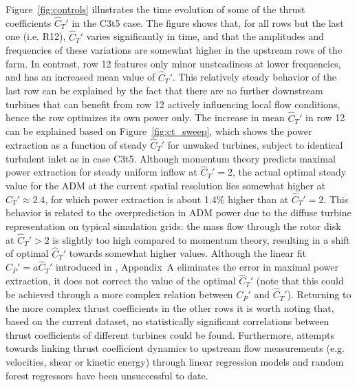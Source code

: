 \documentclass[wes, manuscript]{copernicus}
\newcommand{\cthat}{\widehat{C}_T'}
\begin{document}
Figure~\ref{fig:controls} illustrates the time evolution of some of  the thrust coefficients $\cthat$ in the C3t5 case. The figure shows that, for all rows but the last one (i.e. R12), $\cthat$ varies significantly in time, and that the amplitudes and frequencies of these variations are somewhat higher in the upstream rows of the farm. In contrast, row 12 features only minor unsteadiness at lower frequencies, and has an increased mean value of $\cthat$. This relatively steady behavior of the last row can be explained by the fact that there are no further downstream turbines that can benefit from row 12 actively influencing local flow conditions, hence the row optimizes its own power only. The increase in mean $\cthat$ in row 12 can be explained based on Figure~\ref{fig:ct_sweep}, which shows the power extraction as a function of steady $\cthat$ for unwaked turbines, subject to identical turbulent inlet as in case C3t5. Although momentum theory predicts maximal power extraction for steady uniform inflow at $\cthat = 2$, the actual optimal steady value for the ADM at the current spatial resolution lies somewhat higher at $\cthat \approx 2.4$, for which power extraction is about 1.4\% higher than at $\cthat = 2$. This behavior is related to the overprediction in ADM power due to the diffuse turbine representation on typical simulation grids: the mass flow through the rotor disk at $\cthat > 2$ is slightly too high compared to momentum theory, resulting in a  shift of optimal $\cthat$ towards somewhat higher values. Although the linear fit $C_P' = a \cthat$ introduced in \cite{munters2017optimal}, Appendix~A eliminates the error in maximal power extraction, it does not correct the value of the optimal $\cthat$ (note that this could be achieved through a more complex relation between $C_P'$ and $\cthat$). Returning to the more complex thrust coefficients in the other rows it is worth noting that, based on the current dataset, no statistically significant correlations between thrust coefficients of different turbines could be found. Furthermore, attempts towards linking thrust coefficient dynamics to upstream flow measurements (e.g. velocities, shear or kinetic energy) through linear regression models and random forest regressors have been unsuccessful to date. 
\end{document}

